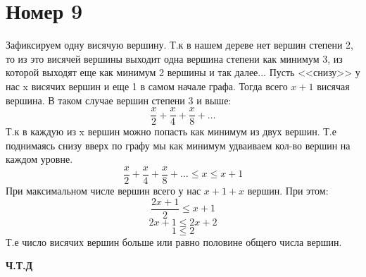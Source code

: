 \documentclass[a4paper,12pt]{article}
\begin{document}
\section*{Номер 9}
Зафиксируем одну висячую вершину. Т.к в нашем дереве нет вершин степени 2, то из это висячей вершины выходит одна вершина степени как минимум 3, из которой выходят еще как минимум 2 вершины и так далее... Пусть <<снизу>> у нас x висячих вершин и еще 1 в самом начале графа. Тогда всего $ x + 1 $  висячая вершина. В таком случае вершин степени 3 и выше:
\[
\frac{x}{2}  + \frac{x}{4} + \frac{x}{8} + \ldots
\]
Т.к в каждую из x вершин можно попасть как минимум из двух вершин. Т.е поднимаясь снизу вверх по графу мы как минимум удваиваем кол-во вершин на каждом уровне.
\[
\frac{x}{2}  + \frac{x}{4} + \frac{x}{8} + \ldots \leq x \leq x + 1
\]
При максимальном числе вершин всего у нас $x + 1 + x$ вершин. При этом:
\[
\frac{2x+1}{2} \leq x + 1
\]
\[
2x + 1 \leq 2x + 2
\]
\[
1 \leq 2
\]
Т.е число висячих вершин больше или равно половине общего числа вершин.
\begin{center}
\textbf{Ч.Т.Д}
\end{center}
\end{document}
